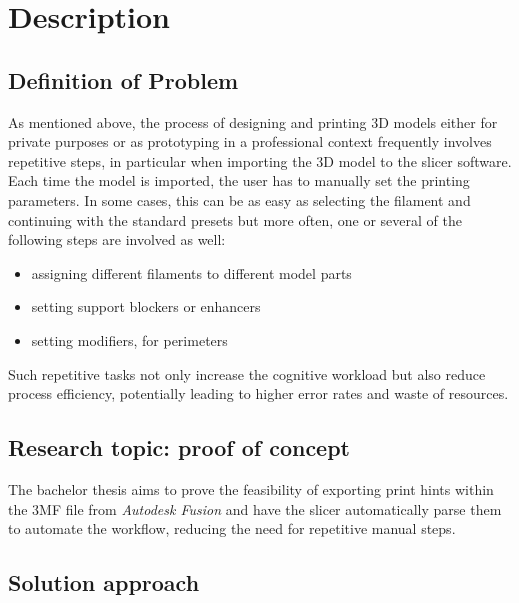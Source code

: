\chapter{Description}\label{ch:data} 

\section{Definition of Problem} 

As mentioned above, the process of designing and printing 3D models either for private purposes or as prototyping in a professional context frequently involves repetitive steps, in particular when importing the 3D model to the slicer software.
Each time the model is imported, the user has to manually set the printing parameters. 
In some cases, this can be as easy as selecting the filament and continuing with the standard presets but more often, one or several of the following steps are involved as well: 
\begin{itemize}
    \item assigning different filaments to different model parts
    \item setting support blockers or enhancers 
    \item setting modifiers, \eg for perimeters
\end{itemize}

Such repetitive tasks not only increase the cognitive workload but also reduce process efficiency, potentially leading to higher error rates and waste of resources.

\section{Research topic: proof of concept}

The bachelor thesis aims to prove the feasibility of exporting print hints within the 3MF file from \emph{Autodesk Fusion} and have the slicer automatically parse them to automate the workflow, reducing the need for repetitive manual steps.

\section{Solution approach}

